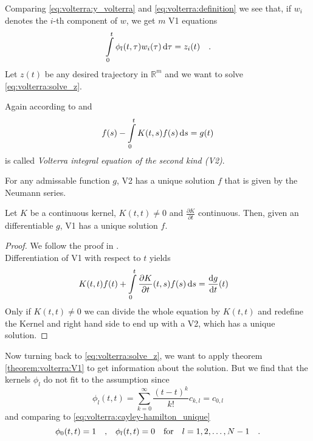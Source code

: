 Comparing \eqref{eq:volterra:y_volterra} and \eqref{eq:volterra:definition}
we see that, if $w_i$ denotes the $i$-th component of $w$, we get $m$ V1 equations
\begin{equation}
\int\limits_0^t \phi_l(t,\tau) w_i(\tau) \, \text{d}\tau = z_i(t) \quad .
\label{eq:volterra:solve_z}
\end{equation}
Let $z(t)$ be any desired trajectory in $\mathbb{R}^m$ and we want to solve 
\eqref{eq:volterra:solve_z}. 

\begin{definition}
Again according to \cite{Heuser} and \cite{Kirsch}
\begin{equation}
f(s)-\int\limits_0^t K(t,s) f(s) \, \text{d} s = g(t)
\end{equation}
is called \textit{Volterra integral equation of the second kind (V2)}.
\end{definition}
\begin{theorem}
For any admissable function $g$, V2 has a uni\-que solution $f$ that is given by the 
Neumann series.
\end{theorem}
\begin{theorem}\label{theorem:volterra:V1}
Let $K$ be a continuous kernel, $K(t,t)\neq 0$ and 
$\frac{\partial K}{\partial t}$ continuous. Then, given an differentiable $g$, V1 has a 
unique solution $f$.
\end{theorem}
\begin{proof}
We follow the proof in \cite{Kirsch}.\\
Differentiation of V1 with respect to $t$ yields
\begin{equation}
K(t,t)f(t) + \int\limits_0^t \frac{\partial K}{\partial t}(t,s) f(s) \, \text{d} s = \frac{\text{d} 
g}{\text{d} t}(t) \quad
\end{equation}
Only if $K(t,t)\neq 0$ we can divide the whole equation by $K(t,t)$ and redefine the 
Kernel and right hand side to end up with a V2, which has a unique solution.
\end{proof}

Now turning back to \eqref{eq:volterra:solve_z}, we want to apply theorem 
\ref{theorem:volterra:V1} to get information about the solution. But we find that 
the kernels $\phi_l$ do not fit to the assumption since
\begin{equation}
\phi_l(t,t) = \sum\limits_{k=0}^\infty \frac{(t-t)^k}{k!} c_{k,l} = c_{0,l}
\end{equation}
and comparing to \eqref{eq:volterra:cayley-hamilton_unique} 
\begin{equation}
\phi_0(t,t) = 1 \quad \text{,} \quad \phi_l (t,t) = 0 \quad \text{for} \quad l=1,2,\ldots,N-1 \quad .
\end{equation}